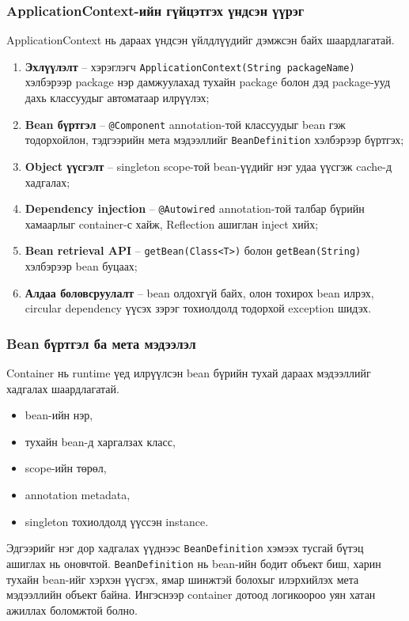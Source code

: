 \subsubsection{ApplicationContext-ийн гүйцэтгэх үндсэн үүрэг}

ApplicationContext нь дараах үндсэн үйлдлүүдийг дэмжсэн байх шаардлагатай.
\begin{enumerate}
    \item \textbf{Эхлүүлэлт} -- хэрэглэгч \texttt{ApplicationContext(String packageName)} хэлбэрээр package нэр дамжуулахад тухайн package болон дэд package-ууд дахь классуудыг автоматаар илрүүлэх;
    \item \textbf{Bean бүртгэл} -- \texttt{@Component} annotation-той классуудыг bean гэж тодорхойлон, тэдгээрийн мета мэдээллийг \texttt{BeanDefinition} хэлбэрээр бүртгэх;
    \item \textbf{Object үүсгэлт} -- singleton scope-той bean-үүдийг нэг удаа үүсгэж cache-д хадгалах;
    \item \textbf{Dependency injection} -- \texttt{@Autowired} annotation-той талбар бүрийн хамаарлыг container-с хайж, Reflection ашиглан inject хийх;
    \item \textbf{Bean retrieval API} -- \texttt{getBean(Class<T>)} болон \texttt{getBean(String)} хэлбэрээр bean буцаах;
    \item \textbf{Алдаа боловсруулалт} -- bean олдохгүй байх, олон тохирох bean илрэх, circular dependency үүсэх зэрэг тохиолдолд тодорхой exception шидэх.
\end{enumerate}

\subsubsection{Bean бүртгэл ба мета мэдээлэл}

Container нь runtime үед илрүүлсэн bean бүрийн тухай дараах мэдээллийг хадгалах шаардлагатай.
\begin{itemize}
    \item bean-ийн нэр,
    \item тухайн bean-д харгалзах класс,
    \item scope-ийн төрөл,
    \item annotation metadata,
    \item singleton тохиолдолд үүссэн instance.
\end{itemize}

Эдгээрийг нэг дор хадгалах үүднээс \texttt{BeanDefinition} хэмээх тусгай бүтэц ашиглах нь оновчтой. \texttt{BeanDefinition} нь bean-ийн бодит объект биш, харин тухайн bean-ийг хэрхэн үүсгэх, ямар шинжтэй болохыг илэрхийлэх мета мэдээллийн объект байна. Ингэснээр container дотоод логикоороо уян хатан ажиллах боломжтой болно.

